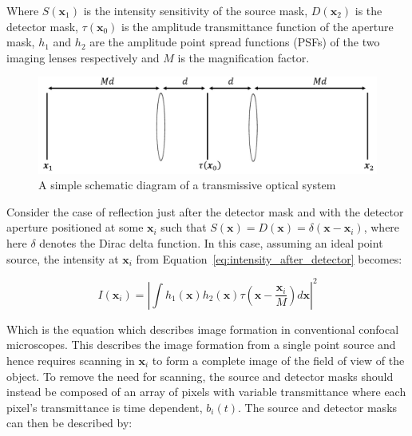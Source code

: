 Where $S\left(\textbf{x}_{1}\right)$ is the intensity 
sensitivity of the source mask, $D\left(\textbf{x}_{2}\right)$ 
is the detector mask, $\tau\left(\textbf{x}_{0}\right)$ is 
the amplitude transmittance function of the aperture mask, 
$h_{1}$ and $h_{2}$ are the amplitude point spread functions 
(PSFs) of the two imaging lenses respectively and $M$ is the 
magnification factor. 

\begin{figure}[h]
	\centering
	\includegraphics[width=\textwidth]{images/optical_system_schematic.jpg}
	\caption[A simple schematic diagram of a transmissive optical system]{A simple schematic diagram of a transmissive optical system}
	\label{fig:optical_system_schematic}
\end{figure}

Consider the case of reflection just after the detector mask 
and with the detector aperture positioned at some 
$\textbf{x}_{i}$ such that $S\left(\textbf{x}\right) = 
D\left(\textbf{x}\right) = \delta\left(\textbf{x} - 
\textbf{x}_{i}\right)$, where here $\delta$ denotes the Dirac 
delta function. In this case, assuming an ideal point source, 
the intensity at $\textbf{x}_{i}$ from 
Equation~\ref{eq:intensity_after_detector} becomes:

\begin{equation}\label{eq:confocal_image_form}
I\left(\textbf{x}_{i}\right) = \left| \int h_{1}\left(\textbf{x}\right) h_{2}\left(\textbf{x}\right) \tau\left(\textbf{x} - \frac{\textbf{x}_{i}}{M}\right)d\textbf{x}\right|^{2}
\end{equation}

Which is the equation which describes image formation in 
conventional confocal microscopes.\cite{wilson1990confocal} 
This describes the image formation from a single point source 
and hence requires scanning in $\textbf{x}_{i}$ to form a 
complete image of the field of view of the object. To remove 
the need for scanning, the source and detector masks should 
instead be composed of an array of pixels with variable 
transmittance where each pixel's transmittance is time 
dependent, $b_{i}\left(t\right)$. The source and detector 
masks can then be described by:

